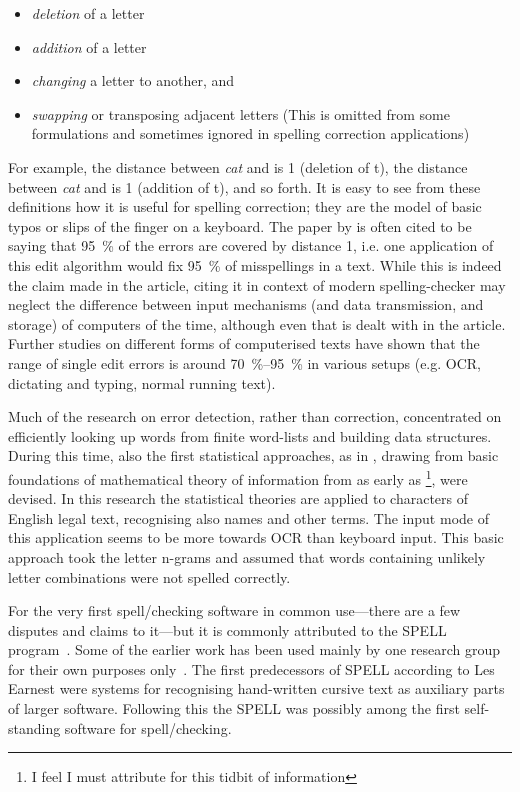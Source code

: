 \documentclass[officiallayout]{unihelcompling}
\newcommand\misspelt{\bgroup\markoverwith
{\textcolor{red}{\lower3.5pt\hbox{\sixly \char58}}}\ULon}
\begin{document}
\begin{itemize}
    \item \emph{deletion} of a letter
    \item \emph{addition} of a letter
    \item \emph{changing} a letter to another, and
    \item \emph{swapping} or transposing adjacent letters
        (This is omitted from some formulations and sometimes ignored in
        spelling correction applications)
\end{itemize}

For example, the distance between \emph{cat} and \misspelt{ca} is 1 (deletion of
t), the distance between \emph{cat} and \misspelt{catt} is 1 (addition of t), and
so forth.  It is easy to see from these definitions how it is useful for
spelling correction; they are the model of basic typos or slips of the finger
on a keyboard. The paper by \citet{damerau1964technique} is often cited to be saying that
95~\% of the errors are covered by distance 1, i.e. one application of this
edit algorithm would fix 95~\% of misspellings in a text. While this is indeed
the claim made in the article, citing it in context of modern spelling-checker
may neglect the difference between input mechanisms (and data transmission, and
storage) of computers of the time, although even that is dealt with in the
article. Further studies on different forms of computerised texts have shown
that the range of single edit errors is around 70~\%--95~\% in various setups
(e.g. OCR, dictating and typing, normal running text).

Much of the research on error detection, rather than correction, concentrated
on efficiently looking up words from finite word-lists and building data
structures. During this time, also the first statistical approaches, as in
\citet{raviv1967decision}, drawing from basic foundations of mathematical
theory of information from as early as
\citet{shannon1948mathematical}\footnote{I feel I must attribute
\citet{liberman2012noisily} for this tidbit of information}, were devised. In
this research the statistical theories are applied to characters of English
legal text, recognising also names and other terms. The input mode of this
application seems to be more towards OCR than keyboard input. This basic
approach took the letter n-grams and assumed that words containing unlikely
letter combinations were not spelled correctly.

For the very first spell\-/checking software in common use---there are a few
disputes and claims to it---but it is commonly attributed to the SPELL
program~\citep{gorin1971spell}.  Some of the earlier work has been used mainly
by one research group for their own purposes 
only~\citep{earnest2011first,earnest2012first}. The first predecessors of SPELL
according to Les Earnest were systems for recognising hand-written cursive text
as auxiliary parts of larger software. Following this the SPELL was possibly
among the first self-standing software for spell\-/checking.
\end{document}
